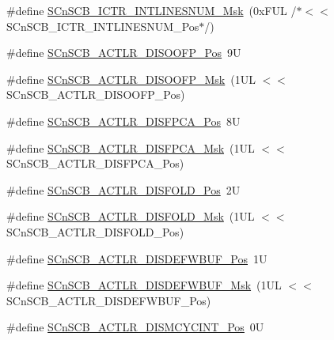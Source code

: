 \begin{DoxyCompactItemize}
\item 
\#define \hyperlink{group___c_m_s_i_s___s_cn_s_c_b_ga3efa0f5210051464e1034b19fc7b33c7}{S\+Cn\+S\+C\+B\+\_\+\+I\+C\+T\+R\+\_\+\+I\+N\+T\+L\+I\+N\+E\+S\+N\+U\+M\+\_\+\+Msk}~(0x\+F\+U\+L /$\ast$$<$$<$ S\+Cn\+S\+C\+B\+\_\+\+I\+C\+T\+R\+\_\+\+I\+N\+T\+L\+I\+N\+E\+S\+N\+U\+M\+\_\+\+Pos$\ast$/)
\item 
\#define \hyperlink{group___c_m_s_i_s___s_cn_s_c_b_gaff0b57464c60fea8182b903676f8de49}{S\+Cn\+S\+C\+B\+\_\+\+A\+C\+T\+L\+R\+\_\+\+D\+I\+S\+O\+O\+F\+P\+\_\+\+Pos}~9U
\item 
\#define \hyperlink{group___c_m_s_i_s___s_cn_s_c_b_ga1ecd6adafa43464d7097b132c19e8640}{S\+Cn\+S\+C\+B\+\_\+\+A\+C\+T\+L\+R\+\_\+\+D\+I\+S\+O\+O\+F\+P\+\_\+\+Msk}~(1\+U\+L $<$$<$ S\+Cn\+S\+C\+B\+\_\+\+A\+C\+T\+L\+R\+\_\+\+D\+I\+S\+O\+O\+F\+P\+\_\+\+Pos)
\item 
\#define \hyperlink{group___c_m_s_i_s___s_cn_s_c_b_gaa194809383bc72ecf3416d85709281d7}{S\+Cn\+S\+C\+B\+\_\+\+A\+C\+T\+L\+R\+\_\+\+D\+I\+S\+F\+P\+C\+A\+\_\+\+Pos}~8U
\item 
\#define \hyperlink{group___c_m_s_i_s___s_cn_s_c_b_ga10d5aa4a196dcde6f476016ece2c1b69}{S\+Cn\+S\+C\+B\+\_\+\+A\+C\+T\+L\+R\+\_\+\+D\+I\+S\+F\+P\+C\+A\+\_\+\+Msk}~(1\+U\+L $<$$<$ S\+Cn\+S\+C\+B\+\_\+\+A\+C\+T\+L\+R\+\_\+\+D\+I\+S\+F\+P\+C\+A\+\_\+\+Pos)
\item 
\#define \hyperlink{group___c_m_s_i_s___s_cn_s_c_b_gaab395870643a0bee78906bb15ca5bd02}{S\+Cn\+S\+C\+B\+\_\+\+A\+C\+T\+L\+R\+\_\+\+D\+I\+S\+F\+O\+L\+D\+\_\+\+Pos}~2U
\item 
\#define \hyperlink{group___c_m_s_i_s___s_cn_s_c_b_gaa9dd2d4a2350499188f438d0aa9fd982}{S\+Cn\+S\+C\+B\+\_\+\+A\+C\+T\+L\+R\+\_\+\+D\+I\+S\+F\+O\+L\+D\+\_\+\+Msk}~(1\+U\+L $<$$<$ S\+Cn\+S\+C\+B\+\_\+\+A\+C\+T\+L\+R\+\_\+\+D\+I\+S\+F\+O\+L\+D\+\_\+\+Pos)
\item 
\#define \hyperlink{group___c_m_s_i_s___s_cn_s_c_b_gafa2eb37493c0f8dae77cde81ecf80f77}{S\+Cn\+S\+C\+B\+\_\+\+A\+C\+T\+L\+R\+\_\+\+D\+I\+S\+D\+E\+F\+W\+B\+U\+F\+\_\+\+Pos}~1U
\item 
\#define \hyperlink{group___c_m_s_i_s___s_cn_s_c_b_ga6cda7b7219232a008ec52cc8e89d5d08}{S\+Cn\+S\+C\+B\+\_\+\+A\+C\+T\+L\+R\+\_\+\+D\+I\+S\+D\+E\+F\+W\+B\+U\+F\+\_\+\+Msk}~(1\+U\+L $<$$<$ S\+Cn\+S\+C\+B\+\_\+\+A\+C\+T\+L\+R\+\_\+\+D\+I\+S\+D\+E\+F\+W\+B\+U\+F\+\_\+\+Pos)
\item 
\#define \hyperlink{group___c_m_s_i_s___s_cn_s_c_b_gaaa3e79f5ead4a32c0ea742b2a9ffc0cd}{S\+Cn\+S\+C\+B\+\_\+\+A\+C\+T\+L\+R\+\_\+\+D\+I\+S\+M\+C\+Y\+C\+I\+N\+T\+\_\+\+Pos}~0U

\end{DoxyCompactItemize}
